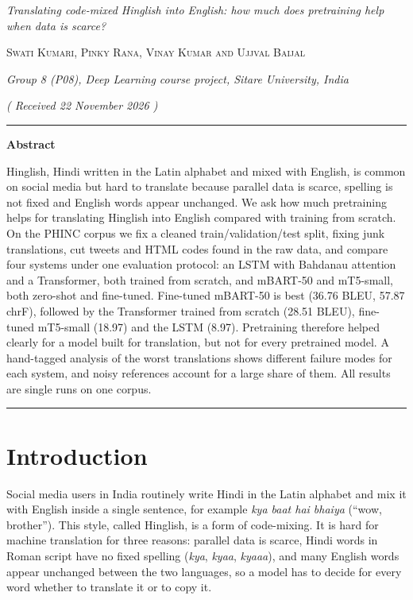 \documentclass[11pt,a4paper]{article}
\begin{document}
\thispagestyle{plain}
\begin{center}
{\LARGE\itshape Translating code-mixed Hinglish into English: how much does pretraining help when data is scarce?\par}
\vspace{1.2em}
{\large\textsc{Swati Kumari, Pinky Rana, Vinay Kumar and Ujjval Baijal}\par}
\vspace{0.4em}
{\small\itshape Group 8 (P08), Deep Learning course project, Sitare University, India\par}
\vspace{0.8em}
{\itshape ( Received 22 November 2026 )\par}
\end{center}
\vspace{0.4em}\hrule\vspace{0.8em}
\begin{center}\textbf{Abstract}\end{center}\vspace{-0.4em}
{\small Hinglish, Hindi written in the Latin alphabet and mixed with English, is common on social media but hard to translate because parallel data is scarce, spelling is not fixed and English words appear unchanged. We ask how much pretraining helps for translating Hinglish into English compared with training from scratch. On the PHINC corpus we fix a cleaned train/validation/test split, fixing junk translations, cut tweets and HTML codes found in the raw data, and compare four systems under one evaluation protocol: an LSTM with Bahdanau attention and a Transformer, both trained from scratch, and mBART-50 and mT5-small, both zero-shot and fine-tuned. Fine-tuned mBART-50 is best (36.76 BLEU, 57.87 chrF), followed by the Transformer trained from scratch (28.51 BLEU), fine-tuned mT5-small (18.97) and the LSTM (8.97). Pretraining therefore helped clearly for a model built for translation, but not for every pretrained model. A hand-tagged analysis of the worst translations shows different failure modes for each system, and noisy references account for a large share of them. All results are single runs on one corpus.\par}
\vspace{0.8em}\hrule\vspace{0.4em}

\section{Introduction}
Social media users in India routinely write Hindi in the Latin alphabet and mix it with English inside a single sentence, for example \textit{kya baat hai bhaiya} (``wow, brother''). This style, called Hinglish, is a form of code-mixing. It is hard for machine translation for three reasons: parallel data is scarce, Hindi words in Roman script have no fixed spelling (\textit{kya}, \textit{kyaa}, \textit{kyaaa}), and many English words appear unchanged between the two languages, so a model has to decide for every word whether to translate it or to copy it.
\end{document}
